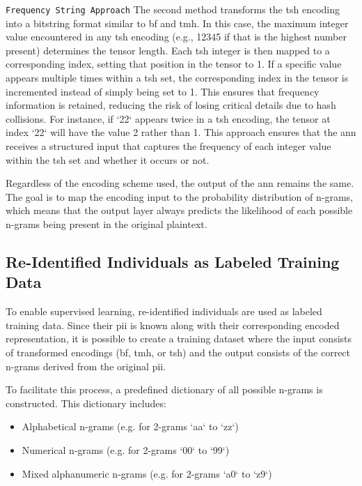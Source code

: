 \texttt{Frequency String Approach}
The second method transforms the \ac{tsh} encoding into a bitstring format similar to \ac{bf} and \ac{tmh}.
In this case, the maximum integer value encountered in any \ac{tsh} encoding (e.g., 12345 if that is the highest number present) determines the tensor length.
Each \ac{tsh} integer is then mapped to a corresponding index, setting that position in the tensor to 1.
If a specific value appears multiple times within a \ac{tsh} set, the corresponding index in the tensor is incremented instead of simply being set to 1.
This ensures that frequency information is retained, reducing the risk of losing critical details due to hash collisions.
For instance, if `22` appears twice in a \ac{tsh} encoding, the tensor at index `22` will have the value 2 rather than 1.
This approach ensures that the \ac{ann} receives a structured input that captures the frequency of each integer value within the \ac{tsh} set and whether it occurs or not.

Regardless of the encoding scheme used, the output of the \ac{ann} remains the same.
The goal is to map the encoding input to the probability distribution of n-grams, which means that the output layer always predicts the likelihood of each possible n-grams being present in the original plaintext.

\subsection{Re-Identified Individuals as Labeled Training Data}

To enable supervised learning, re-identified individuals are used as labeled training data.
Since their \ac{pii} is known along with their corresponding encoded representation, it is possible to create a training dataset where the input consists of transformed encodings (\ac{bf}, \ac{tmh}, or \ac{tsh}) and the output consists of the correct n-grams derived from the original \ac{pii}.

To facilitate this process, a predefined dictionary of all possible n-grams is constructed. This dictionary includes:
\begin{itemize}
   \item Alphabetical n-grams (e.g. for 2-grams `aa` to `zz`)
   \item Numerical n-grams (e.g. for 2-grams `00` to `99`)
   \item Mixed alphanumeric n-grams (e.g. for 2-grams `a0` to `z9`)
\end{itemize}

